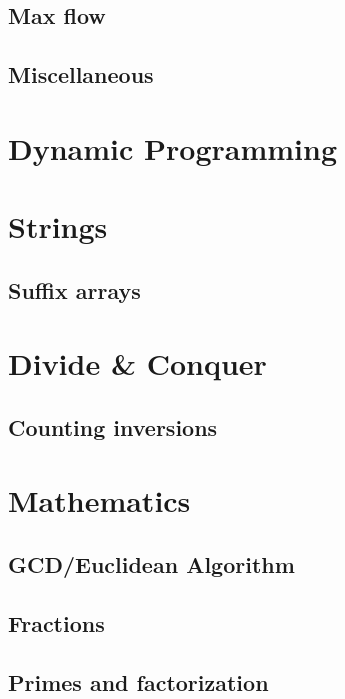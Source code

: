 \documentclass[10pt]{book}
\newif\iftodos
\newcommand{\todo}[1]{\iftodos\textcolor{red}{[TODO: #1]}\fi}
\begin{document}
\section{Max flow}

\section{Miscellaneous}

\todo{New virtual source/sink node trick}

\chapter{Dynamic Programming}

\chapter{Strings}

\section{Suffix arrays}

\chapter{Divide \& Conquer}

\section{Counting inversions}

\chapter{Mathematics}

\section{GCD/Euclidean Algorithm}

\section{Fractions}

\section{Primes and factorization}

\todo{Basic primality testing and factorization with trial division.
  Sieving (primes, factors, Euler totient).}
\end{document}
